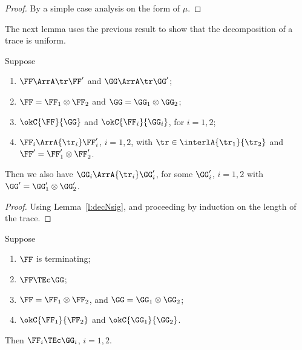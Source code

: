 \begin{proof}
By a simple case analysis on the form of $\mu$.
\end{proof} 
\noindent
The next lemma uses the previous result to show that the decomposition of a trace 
is uniform.

\begin{lemma}
\label{l:decNsig2}
Suppose 
\begin{enumerate}
\item
$\FF \ArrA \tr   \FF'$
and $\GG \ArrA \tr   \GG'$;
\item  
 $\FF = \FF_1 \otimes \FF_2$ and 
 $\GG = \GG_1 \otimes \GG_2$;  
\item 
  $\okC{\FF}{\GG}$ and  
  $\okC{\FF_i}{\GG_i}$, for $i=1,2$;   
\item 
$\FF_i \ArrA{\tr_i}  \FF_i'$, $i=1,2$,  with $\tr \in \interlA{\tr_1}{\tr_2}$ and 
 $\FF' = \FF'_1 \otimes \FF'_2$.
\end{enumerate} 
Then we also have 
$\GG_i \ArrA{\tr_i}   \GG_i'$, for some $\GG_i'$, 
$i=1,2$ with 
 $\GG' = \GG'_1 \otimes \GG'_2$.
\end{lemma} 


\begin{proof}
  Using Lemma~\ref{l:decNsig}, and proceeding by induction on the length of the trace.  
\end{proof} 


\begin{lemma}
\label{l:decACN}
 Suppose 
 \begin{enumerate}
   \item $\FF$ is terminating;
   \item 
   $\FF  \TEc \GG$; 
   \item 
   $\FF = \FF_1 \otimes \FF_2$,   
   and  
   $\GG = \GG_1 \otimes \GG_2$;
   \item $\okC{\FF_1}{\FF_2}$ and $\okC{\GG_1}{\GG_2}$.
 \end{enumerate} 
 Then
 $\FF_i \TEc \GG_i$, $i=1,2$. 
\end{lemma}  

